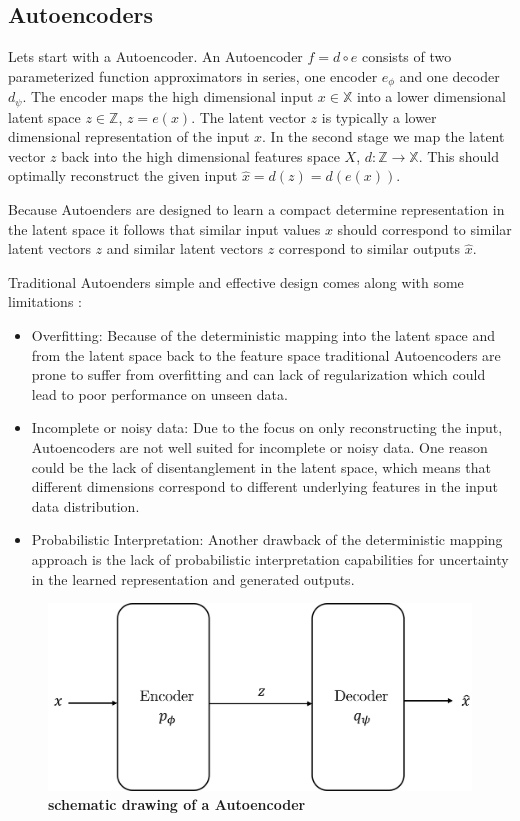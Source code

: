 \subsection{Autoencoders}


Lets start with a Autoencoder. An Autoencoder $f = d \circ e$ consists of two parameterized function approximators in series, one encoder $e_\phi$ and one decoder $d_\psi$. 
The encoder maps the high dimensional input $x \in \mathbb{X}$ into a lower dimensional latent space $z \in \mathbb{Z}$, $z = e(x)$.
The latent vector $z$ is typically a lower dimensional representation of the input $x$. 
In the second stage we map the latent vector $z$ back into the high dimensional features space $X$, $d: \mathbb{Z} \to \mathbb{X}$. This should optimally reconstruct the given input $\hat{x} = d(z) = d(e(x))$. 

Because Autoenders are designed to learn a compact determine representation in the latent space it follows that similar input values $x$ should correspond to similar latent vectors $z$ and similar latent vectors $z$ correspond to similar outputs $\hat{x}$.

Traditional Autoenders simple and effective design comes along with some limitations \cite{pml2Book}:
\begin{itemize}
	\item Overfitting: Because of the deterministic mapping into the latent space and from the latent space back to the feature space traditional Autoencoders are prone to suffer from overfitting and can lack of regularization which could lead to poor performance on unseen data.
	\item Incomplete or noisy data: Due to the focus on only reconstructing the input, Autoencoders are not well suited for incomplete or noisy data. One reason could be the lack of disentanglement in the latent space, which means that different dimensions correspond to different underlying features in the input data distribution. 
	\item Probabilistic Interpretation: Another drawback of the deterministic mapping approach is the lack of probabilistic interpretation capabilities for uncertainty in the learned representation and generated outputs.  
\end{itemize}
\begin{figure}
    \centering
    \includegraphics[width=0.5\linewidth]{figures/background/Autoencoder.png}
    \caption[Autoencoder schematics]{\textbf{schematic drawing of a Autoencoder}}
    \label{fig:Autoencoder_schematics}
\end{figure}

